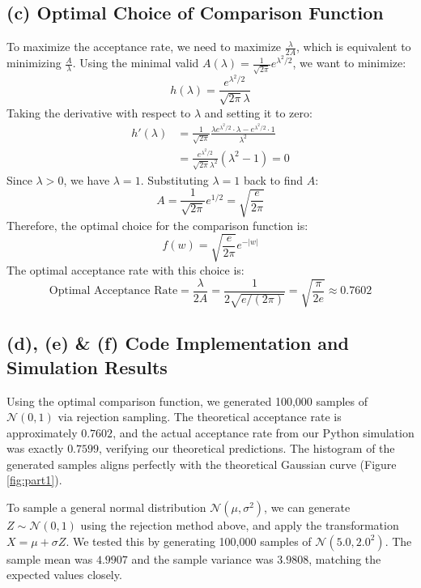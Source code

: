\documentclass[11pt]{article}
\begin{document}
\subsection{(c) Optimal Choice of Comparison Function}

To maximize the acceptance rate, we need to maximize $\frac{\lambda}{2A}$, which is equivalent to minimizing $\frac{A}{\lambda}$. Using the minimal valid $A(\lambda) = \frac{1}{\sqrt{2\pi}} e^{\lambda^2/2}$, we want to minimize:
\begin{equation*}
h(\lambda) = \frac{e^{\lambda^2/2}}{\sqrt{2\pi}\lambda}
\end{equation*}
Taking the derivative with respect to $\lambda$ and setting it to zero:
\begin{align*}
h'(\lambda) &= \frac{1}{\sqrt{2\pi}} \frac{\lambda e^{\lambda^2/2} \cdot \lambda - e^{\lambda^2/2} \cdot 1}{\lambda^2} \\
&= \frac{e^{\lambda^2/2}}{\sqrt{2\pi}\lambda^2} (\lambda^2 - 1) = 0
\end{align*}
Since $\lambda > 0$, we have $\lambda = 1$. Substituting $\lambda = 1$ back to find $A$:
\begin{equation*}
A = \frac{1}{\sqrt{2\pi}} e^{1/2} = \sqrt{\frac{e}{2\pi}}
\end{equation*}
Therefore, the optimal choice for the comparison function is:
\begin{equation}
f(w) = \sqrt{\frac{e}{2\pi}} e^{-|w|}
\end{equation}
The optimal acceptance rate with this choice is:
\begin{equation}
\text{Optimal Acceptance Rate} = \frac{\lambda}{2A} = \frac{1}{2 \sqrt{e/(2\pi)}} = \sqrt{\frac{\pi}{2e}} \approx 0.7602
\end{equation}

\subsection{(d), (e) \& (f) Code Implementation and Simulation Results}

Using the optimal comparison function, we generated 100,000 samples of $\mathcal{N}(0, 1)$ via rejection sampling.
The theoretical acceptance rate is approximately $0.7602$, and the actual acceptance rate from our Python simulation was exactly $0.7599$, verifying our theoretical predictions. The histogram of the generated samples aligns perfectly with the theoretical Gaussian curve (Figure \ref{fig:part1}).

To sample a general normal distribution $\mathcal{N}(\mu, \sigma^2)$, we can generate $Z \sim \mathcal{N}(0, 1)$ using the rejection method above, and apply the transformation $X = \mu + \sigma Z$. We tested this by generating 100,000 samples of $\mathcal{N}(5.0, 2.0^2)$. The sample mean was $4.9907$ and the sample variance was $3.9808$, matching the expected values closely.
\end{document}
